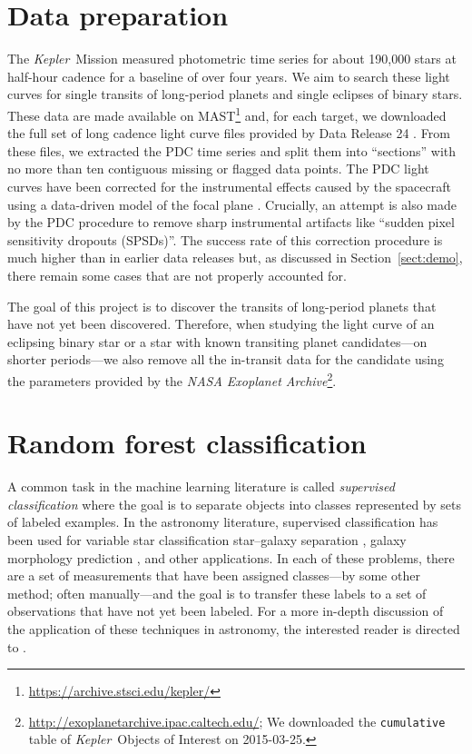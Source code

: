 \documentclass[12pt,preprint]{aastex}
\newcommand{\project}[1]{\textsl{#1}}
\newcommand{\kepler}{\project{Kepler}}
\newcommand{\sectionname}{Section}
\newcommand{\sectref}[1]{\ref{sect:#1}}
\newcommand{\Sect}[1]{\sectionname~\sectref{#1}}
\newcommand{\sect}[1]{\Sect{#1}}
\newcommand{\sectlabel}[1]{\label{sect:#1}}
\begin{document}
\section{Data preparation}\sectlabel{data}

The \kepler\ Mission measured photometric time series for about 190,000 stars
at half-hour cadence for a baseline of over four years.
We aim to search these light curves for single transits of long-period planets
and single eclipses of binary stars.
These data are made available on
MAST\footnote{\url{https://archive.stsci.edu/kepler/}} and, for each target,
we downloaded the full set of long cadence light curve files provided by Data
Release 24 \citep{Thompson:2015}.
From these files, we extracted the PDC time series and split them into
``sections'' with no more than ten contiguous missing or flagged data points.
The PDC light curves have been corrected for the instrumental effects caused
by the spacecraft using a data-driven model of the focal plane
\citep{Stumpe:2012, Smith:2012}.
Crucially, an attempt is also made by the PDC procedure to remove sharp
instrumental artifacts like ``sudden pixel sensitivity dropouts (SPSDs)''.
The success rate of this correction procedure is much higher than in earlier
data releases but, as discussed in \sect{demo}, there remain some cases that
are not properly accounted for.

The goal of this project is to discover the transits of long-period planets
that have not yet been discovered.
Therefore, when studying the light curve of an eclipsing binary star or a star
with known transiting planet candidates---on shorter periods---we also remove
all the in-transit data for the candidate using the parameters provided by the
\project{NASA Exoplanet
Archive}\footnote{\url{http://exoplanetarchive.ipac.caltech.edu/}; We
downloaded the \texttt{cumulative} table of \kepler\ Objects of Interest on
2015-03-25.}.



\section{Random forest classification}\sectlabel{rfc}

A common task in the machine learning literature is called \emph{supervised
classification} where the goal is to separate objects into classes
represented by sets of labeled examples.
In the astronomy literature, supervised classification has been used for
variable star classification \citep{Richards:2011} star--galaxy separation
\citep{Fadely:2012}, galaxy morphology prediction \citep{Dieleman:2015}, and
other applications.
In each of these problems, there are a set of measurements that have been
assigned classes---by some other method; often manually---and the goal is to
transfer these labels to a set of observations that have not yet been
labeled.
For a more in-depth discussion of the application of these techniques in
astronomy, the interested reader is directed to \citet{Ivezic:2013}.
\end{document}

